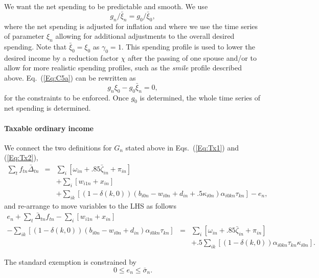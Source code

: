 \documentclass{report}[fleqn,12pt]
\begin{document}
	We want the net spending to be predictable and smooth. We use
\begin{equation}
	\label{Eq:C5a}
	g_{n}/\bar{\xi}_{n} = g_0/\bar{\xi}_0,
\end{equation}
where the net spending is adjusted for inflation and where we use the time series of parameter $\xi_n$ 
allowing for additional adjustments to the overall desired spending.
Note that $\bar{\xi}_0 = \xi_0$ as $\gamma_0=1$.
This spending profile is used to lower the desired income by a reduction factor $\chi$
after the passing of one spouse and/or to allow for more realistic spending profiles, such as
the {\em smile} profile described above.
Eq.~(\ref{Eq:C5a}) can be rewritten as
\begin{equation}
	\label{Eq:C5}
	g_n \xi_0 - g_0 \bar{\xi}_n = 0,
\end{equation}
for the constraints to be enforced. Once $g_0$ is determined, the whole time series of net spending
is determined.

\paragraph*{Taxable ordinary income}
	We connect the two definitions for $G_n$ stated above in Eqs.~(\ref{Eq:Tx1}) and (\ref{Eq:Tx2}),
	\begin{eqnarray}
		\sum_t f_{t n}\bar{\Delta}_{t n} &=&
		\sum_i [\omega_{in} + .85\bar\zeta_{in} + \pi_{in}]  \nonumber \\
		&& + \sum_{i} [w_{i1n} + x_{in} ]
		\nonumber\\
		&& + \sum_{ik} [(1 - \delta(k, 0))(b_{i0n} - w_{i0n} + d_{in} + .5\kappa_{i0n})\alpha_{i0kn}\tau_{kn}] - e_n,
	\end{eqnarray}
	and re-arrange to move variables to the LHS as follows
	\begin{eqnarray}
		\label{Eq:C6}
		e_n + \sum_t \bar{\Delta}_{t n} f_{t n}
		- \sum_{i} [ w_{i1n} + x_{in}] &&
		\nonumber \\
		- \sum_{ik} [(1 - \delta(k, 0))(b_{i0n} - w_{i0n} + d_{in})\alpha_{i0kn}\tau_{kn}] &=&
		\sum_i [\omega_{in} + .85\bar\zeta_{in} + \pi_{in} ] 
		\nonumber \\
		&& + .5\sum_{ik} [(1-\delta(k, 0))\alpha_{i0kn}\tau_{kn}\kappa_{i0n}].
	\end{eqnarray}

	The standard exemption is constrained by
	\begin{equation}
		0 \le e_n \le \bar{\sigma}_n.
	\end{equation}
\end{document}
